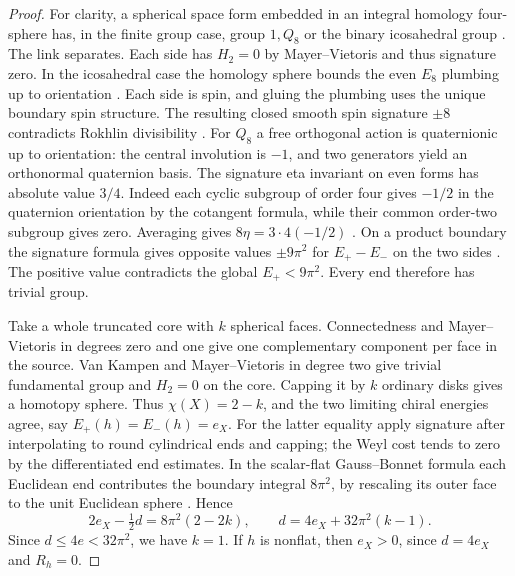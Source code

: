 \begin{proof}
For clarity, a spherical space form embedded in an integral homology
four-sphere has, in the finite group case, group \(1,Q_8\) or the
binary icosahedral group \cite[Theorem 5.2(1)]{Hillman2024LocallyFlat}.
The link separates. Each side has \(H_2=0\) by Mayer--Vietoris
and thus signature zero. In the icosahedral case the homology
sphere bounds the even \(E_8\) plumbing up to orientation
\cite{KirbyScharlemann1979Poincare}. Each side is spin, and gluing
the plumbing uses the unique boundary spin structure. The resulting
closed smooth spin signature \(\pm8\) contradicts Rokhlin divisibility
\cite{Rokhlin1971Submanifolds}. For \(Q_8\) a free orthogonal
action is quaternionic up to orientation: the central involution is
\(-1\), and two generators yield an orthonormal quaternion basis.
The signature eta invariant on even forms has absolute value \(3/4\).
Indeed each cyclic subgroup of order four gives \(-1/2\) in the
quaternion orientation by the cotangent formula, while their common
order-two subgroup gives zero. Averaging gives
\(8\eta=3\cdot4(-1/2)\)
\cite[Proposition 2.12]{APS1975SpectralII}. On a product boundary
the signature formula gives opposite values \(\pm9\pi^2\) for
\(E_+-E_-\) on the two sides \cite[Theorem 4.14]{APS1975SpectralI}.
The positive value contradicts the global \(E_+<9\pi^2\).
Every end therefore has trivial group.

Take a whole truncated core with \(k\) spherical faces. Connectedness
and Mayer--Vietoris in degrees zero and one give one complementary
component per face in the source. Van Kampen and Mayer--Vietoris in
degree two give trivial fundamental group and \(H_2=0\) on the core.
Capping it by \(k\) ordinary disks gives a homotopy sphere.
Thus \(\chi(X)=2-k\), and the two limiting chiral energies agree,
say \(E_+(h)=E_-(h)=e_X\). For the latter equality apply signature
after interpolating to round cylindrical ends and capping; the Weyl
cost tends to zero by the differentiated end estimates.
In the scalar-flat Gauss--Bonnet formula each Euclidean end contributes
the boundary integral \(8\pi^2\), by rescaling its outer face to the
unit Euclidean sphere \cite[\S7]{TianViaclovsky2005ALE}. Hence
\[
 2e_X-\tfrac12d=8\pi^2(2-2k),\qquad
 d=4e_X+32\pi^2(k-1).
\]
Since \(d\le4e<32\pi^2\), we have \(k=1\). If \(h\) is nonflat,
then \(e_X>0\), since \(d=4e_X\) and \(R_h=0\).


\end{proof}
